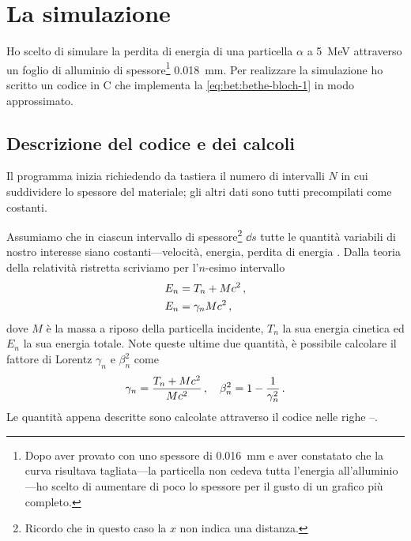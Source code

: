 \section{La simulazione}
    Ho scelto di simulare la perdita di energia di una particella $\alpha$ a \SI{5}{\mega\eV} attraverso un foglio di alluminio di spessore\footnote{Dopo aver provato con uno spessore di \SI{0.016}{\milli\meter} e aver constatato che la curva risultava tagliata---la particella non cedeva tutta l'energia all'alluminio---ho scelto di aumentare di poco lo spessore per il gusto di un grafico più completo.} \SI{0.018}{\milli\meter}. Per realizzare la simulazione ho scritto un codice in C che implementa la \eqref{eq:bet:bethe-bloch-1} in modo approssimato.
    \subsection{Descrizione del codice e dei calcoli}
        Il programma inizia richiedendo da tastiera il numero di intervalli $N$ in cui suddividere lo spessore del materiale; gli altri dati sono tutti precompilati come costanti. 
        
        Assumiamo che in ciascun intervallo di spessore\footnote{Ricordo che in questo caso la $x$ non indica una distanza.} $\dd{s}$ tutte le quantità variabili di nostro interesse siano costanti---velocità, energia, perdita di energia \myetc. Dalla teoria della relatività ristretta scriviamo per l'$n$-esimo intervallo
        \begin{align*}   
                E_n &= T_n + M c^2 \,, \\
                E_n &= \gamma_n M c^2 \,,
        \end{align*}
        dove $M$ è la massa a riposo della particella incidente, $T_n$ la sua energia cinetica ed $E_n$ la sua energia totale. Note queste ultime due quantità, è possibile calcolare il fattore di Lorentz $\gamma_n$ e $\beta_n^2$ come
        \begin{equation*}
            \gamma_n = \frac{T_n + M c^2}{M c^2}
            \,,
            \quad
            \beta_n^2 = 1 - \frac{1}{\gamma_n^2}
            \,.
        \end{equation*}
        Le quantità appena descritte sono calcolate attraverso il codice nelle righe --.

